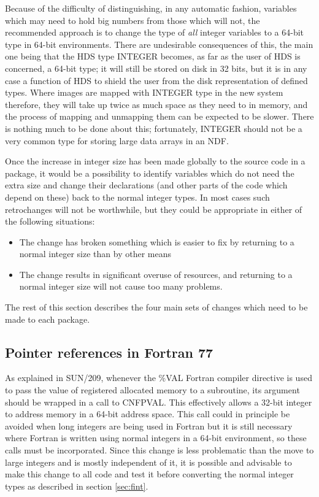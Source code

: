 \documentclass[twoside,11pt]{article}
\newcommand{\xref}[3]{#1}
\renewcommand{\_}{\texttt{\symbol{95}}}
\begin{document}
Because of the difficulty of distinguishing, in any automatic fashion,
variables which may
need to hold big numbers from those which will not,
the recommended approach is to change the type of {\em all\/}
integer variables to a 64-bit type in 64-bit environments.
There are undesirable consequences of this,
the main one being that
the HDS type \_INTEGER becomes, as far as the user of HDS is concerned,
a 64-bit type;
it will still be stored on disk in 32 bits, but it is in any case a
function of HDS to shield the user from the disk representation
of defined types.
Where images are mapped with \_INTEGER type in the new system therefore,
they will take up twice as much space as they need to in memory,
and the process of mapping and unmapping them can be expected to be slower.
There is nothing much to be done about this;
fortunately, \_INTEGER should not be a very common type for
storing large data arrays in an NDF.

Once the increase in integer size has been made
globally to the source code in a package,
it would be a possibility
to identify variables which do not need the extra size
and change their declarations (and other parts of the code which depend
on these) back to the normal integer types.
In most cases such retrochanges will not be worthwhile,
but they could be appropriate in either of the following situations:
\begin{itemize}
\item
The change has broken something which is easier to fix by returning to
a normal integer size than by other means
\item
The change results in significant overuse of resources,
and returning to a normal
integer size will not cause too many problems.
\end{itemize}

The rest of this section describes the four main sets of changes
which need to be made to each package.

\subsection{Pointer references in Fortran 77}

As explained in \xref{SUN/209}{sun209}{pointers},
whenever the \%VAL Fortran compiler directive
is used to pass the value of registered allocated
memory to a subroutine, its argument should be wrapped in a call
to \xref{CNF\_PVAL}{sun209}{CNF\_PVAL}.  This effectively allows
a 32-bit integer to address memory in a 64-bit address space.
This call could in principle be avoided
when long integers are being used in Fortran
but it is still
necessary where Fortran is written using normal integers in a
64-bit environment,
so these calls must be incorporated.
Since this change is less problematic than the move to large integers
and is mostly independent of it,
it is possible and advisable to make this
change to all code and test it before converting the normal integer types
as described in section \ref{sec:fint}.
\end{document}
